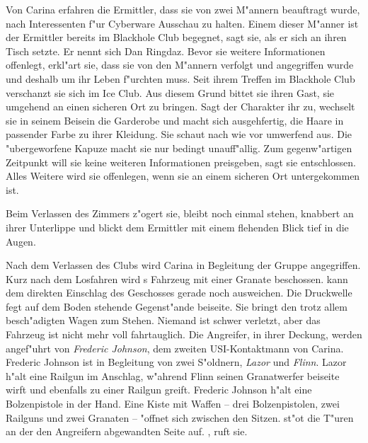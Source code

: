 Von Carina erfahren die Ermittler, dass sie von zwei M"annern beauftragt wurde, nach Interessenten f"ur Cyberware Ausschau zu halten. Einem dieser M"anner ist der Ermittler bereits im Blackhole Club begegnet, sagt sie, als er sich an ihren Tisch setzte. Er nennt sich Dan Ringdaz. Bevor sie weitere Informationen offenlegt, erkl"art sie, dass sie von den M"annern verfolgt und angegriffen wurde und deshalb um ihr Leben f"urchten muss. Seit ihrem Treffen im Blackhole Club verschanzt sie sich im Ice Club. Aus diesem Grund bittet sie ihren Gast, sie umgehend an einen sicheren Ort zu bringen. Sagt der Charakter ihr zu, wechselt sie in seinem Beisein die Garderobe und macht sich ausgehfertig, die Haare in passender Farbe zu ihrer Kleidung. Sie schaut nach wie vor umwerfend aus. Die "ubergeworfene Kapuze macht sie nur bedingt unauff"allig. Zum gegenw"artigen Zeitpunkt will sie keine weiteren Informationen preisgeben, sagt sie entschlossen. Alles Weitere wird sie offenlegen, wenn sie an einem sicheren Ort untergekommen ist.

Beim Verlassen des Zimmers z"ogert sie, bleibt noch einmal stehen, knabbert an ihrer Unterlippe und blickt dem Ermittler mit einem flehenden Blick tief in die Augen.


Nach dem Verlassen des Clubs wird Carina in Begleitung der Gruppe angegriffen. Kurz nach dem Losfahren wird \xl{}s Fahrzeug mit einer Granate beschossen. \xl{} kann dem direkten Einschlag des Geschosses gerade noch ausweichen. Die Druckwelle fegt auf dem Boden stehende Gegenst"ande beiseite. Sie bringt den trotz allem besch"adigten Wagen zum Stehen. Niemand ist schwer verletzt, aber das Fahrzeug ist nicht mehr voll fahrtauglich. Die Angreifer, in ihrer Deckung, werden angef"uhrt von \emph{Frederic Johnson}, dem zweiten USI-Kontaktmann von Carina. Frederic Johnson ist in Begleitung von zwei S"oldnern, \emph{Lazor} und \emph{Flinn}. Lazor h"alt eine Railgun im Anschlag, w"ahrend Flinn seinen Granatwerfer beiseite wirft und ebenfalls zu einer Railgun greift. Frederic Johnson h"alt eine Bolzenpistole in der Hand. Eine Kiste mit Waffen -- drei Bolzenpistolen, zwei Railguns und zwei Granaten -- "offnet sich zwischen den Sitzen. \xl{} st"o\3t die T"uren an der den Angreifern abgewandten Seite auf. , ruft sie.

